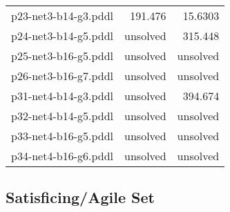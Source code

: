 \documentclass{article}
\begin{document}
\begin{center}
\begin{tabular}{r|r|r}
 p23-net3-b14-g3.pddl&191.476&15.6303\\
 p24-net3-b14-g5.pddl&unsolved&315.448\\
 p25-net3-b16-g5.pddl&unsolved&unsolved\\
 p26-net3-b16-g7.pddl&unsolved&unsolved\\
 p31-net4-b14-g3.pddl&unsolved&394.674\\
 p32-net4-b14-g5.pddl&unsolved&unsolved\\
 p33-net4-b16-g5.pddl&unsolved&unsolved\\
 p34-net4-b16-g6.pddl&unsolved&unsolved
                            \end{tabular}
                            \end{center}
                    
                    
                    \subsection*{Satisficing/Agile Set}
                    
\end{document}
